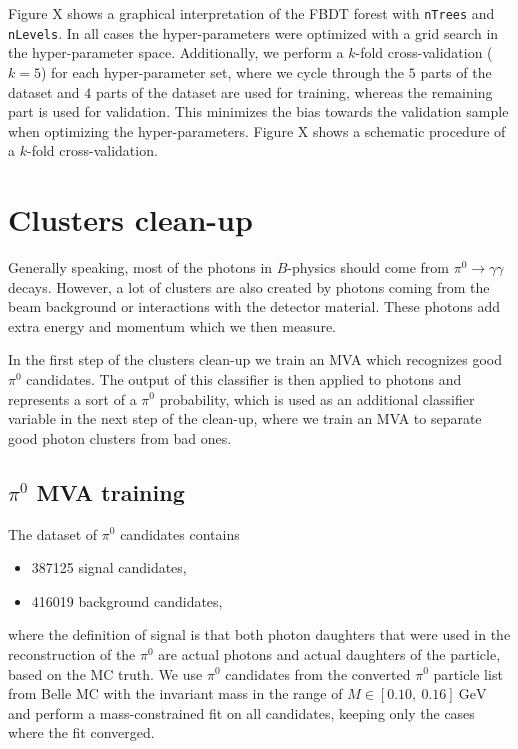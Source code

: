 \documentclass[oneside,a4paper,openany,12pt]{scrbook}
\newcommand {\e}[1]{\mathrm{~#1}}
\begin{document}
Figure X shows a graphical interpretation of the FBDT forest with \texttt{nTrees} and \texttt{nLevels}. In all cases the hyper-parameters were optimized with a grid search in the hyper-parameter space. Additionally, we perform a $k$-fold cross-validation ($k=5$) for each hyper-parameter set, where we cycle through the $5$ parts of the dataset and $4$ parts of the dataset are used for training, whereas the remaining part is used for validation. This minimizes the bias towards the validation sample when optimizing the hyper-parameters. Figure X shows a schematic procedure of a $k$-fold cross-validation.

\section{Clusters clean-up}

Generally speaking, most of the photons in $B$-physics should come from $\pi^0 \to \gamma \gamma$ decays. However, a lot of clusters are also created by photons coming from the beam background or interactions with the detector material. These photons add extra energy and momentum which we then measure.

In the first step of the clusters clean-up we train an MVA which recognizes good $\pi^0$ candidates. The output of this classifier is then applied to photons and represents a sort of a $\pi^0$ probability, which is used as an additional classifier variable in the next step of the clean-up, where we train an MVA to separate good photon clusters from bad ones.

\subsection{$\pi^0$ MVA training}

The dataset of $\pi^0$ candidates contains
\begin{itemize}
\item 387125 signal candidates,
\item 416019 background candidates,
\end{itemize}
where the definition of signal is that both photon daughters that were used in the reconstruction of the $\pi^0$ are actual photons and actual daughters of the particle, based on the MC truth. We use $\pi^0$ candidates from the converted $\pi^0$ particle list from Belle MC with the invariant mass in the range of $M \in [0.10,~0.16]\e{GeV}$ and perform a mass-constrained fit on all candidates, keeping only the cases where the fit converged. 
\end{document}
